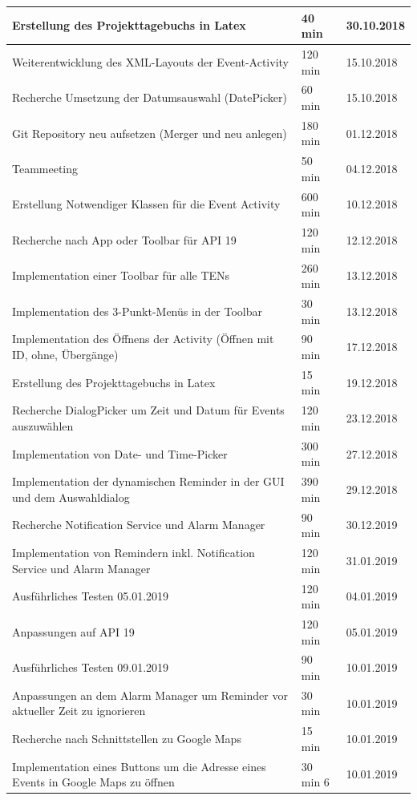 \begin{longtable}{|p{10cm}|p{2cm}|p{2cm}|}
Erstellung des Projekttagebuchs in Latex & 40 min & 30.10.2018 \\ \hline
Weiterentwicklung des XML-Layouts der Event-Activity & 120 min & 15.10.2018\\ \hline
Recherche Umsetzung der Datumsauswahl (DatePicker) & 60 min & 15.10.2018\\ \hline
Git Repository neu aufsetzen (Merger und neu anlegen) & 180 min & 01.12.2018\\ \hline
Teammeeting & 50 min & 04.12.2018\\ \hline
Erstellung Notwendiger Klassen für die Event Activity & 600 min & 10.12.2018 \\ \hline
Recherche nach App oder Toolbar für API 19 & 120 min & 12.12.2018 \\ \hline
Implementation einer Toolbar für alle TENs & 260 min & 13.12.2018 \\ \hline
Implementation des 3-Punkt-Menüs in der Toolbar & 30 min & 13.12.2018 \\ \hline
Implementation des Öffnens der Activity (Öffnen mit ID, ohne, Übergänge) & 90 min &  17.12.2018\\ \hline
Erstellung des Projekttagebuchs in Latex & 15 min & 19.12.2018 \\ \hline
Recherche DialogPicker um Zeit und Datum für Events auszuwählen & 120 min & 23.12.2018 \\ \hline
Implementation von Date- und Time-Picker & 300 min & 27.12.2018 \\ \hline
Implementation der dynamischen Reminder in der GUI und dem Auswahldialog & 390 min & 29.12.2018 \\ \hline
Recherche Notification Service und Alarm Manager & 90 min & 30.12.2019 \\ \hline
Implementation von Remindern inkl. Notification Service und Alarm Manager & 120 min & 31.01.2019 \\ \hline
Ausführliches Testen 05.01.2019 & 120 min & 04.01.2019\\ \hline
Anpassungen auf API 19 & 120 min & 05.01.2019 \\ \hline
Ausführliches Testen 09.01.2019 & 90 min & 10.01.2019\\ \hline
Anpassungen an dem Alarm Manager um Reminder vor aktueller Zeit zu ignorieren & 30 min & 10.01.2019 \\ \hline
Recherche nach Schnittstellen zu Google Maps & 15 min & 10.01.2019 \\ \hline
Implementation eines Buttons um die Adresse eines Events in Google Maps zu öffnen & 30 min 6 & 10.01.2019 \\ \hline

\end{longtable}
